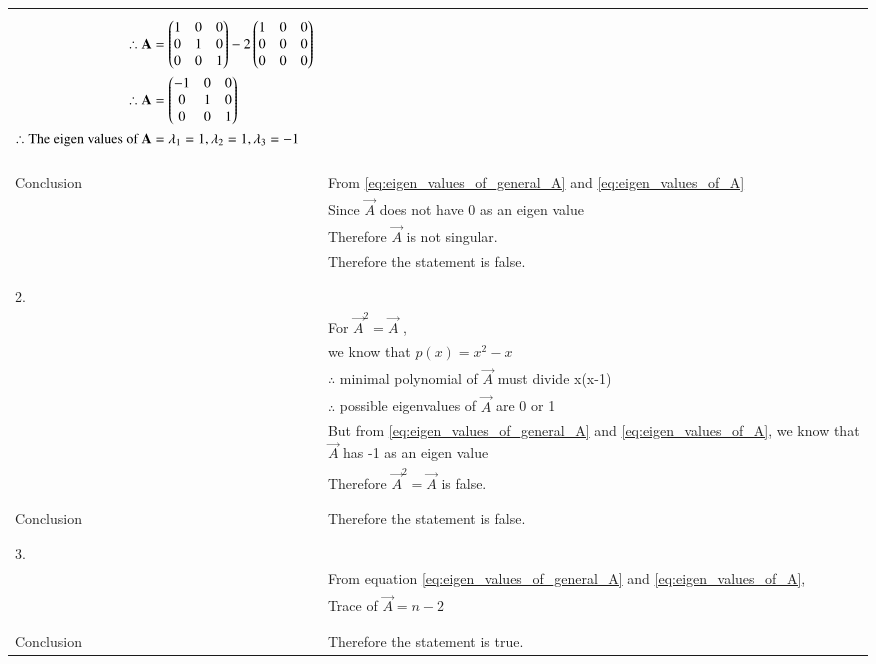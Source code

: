 \documentclass[journal,12pt]{IEEEtran}
\begin{document}
\begin{longtable}{|l|l|}
{\begin{align}
    \therefore \mathbf{A}&=\begin{pmatrix}1&0&0\\0&1&0\\0&0&1\end{pmatrix}-2\begin{pmatrix}1&0&0\\0&0&0\\0&0&0\end{pmatrix}\\
    \therefore \mathbf{A}&=\begin{pmatrix}-1&0&0\\0&1&0\\0&0&1\end{pmatrix}\label{eq:example_of_A}\\
    \therefore \mbox{The eigen values of }\mathbf{A}&=\lambda_1=1,\lambda_2=1,\lambda_3=-1\label{eq:eigen_values_of_A}
\end{align}}\\
&\\
\hline
&\\
Conclusion&From \eqref{eq:eigen_values_of_general_A} and \eqref{eq:eigen_values_of_A}\\
&Since $\vec{A}$ does not have 0 as an eigen value\\
&Therefore $\vec{A}$ is not singular.\\
&Therefore the statement is false.\\
&\\
\hline
&\\
2.&\\
& For $\vec{A}^2=\vec{A}$ ,\\
&we know that $p(x)=x^2-x$\\
&$\therefore$ minimal polynomial of $\vec{A}$ must divide x(x-1)\\
&$\therefore$ possible eigenvalues of $\vec{A}$ are 0 or 1\\
&But from \eqref{eq:eigen_values_of_general_A} and \eqref{eq:eigen_values_of_A}, we know that $\vec{A}$ has -1 as an eigen value\\
&Therefore $\vec{A}^2=\vec{A}$ is false.\\
&\\
\hline
&\\
Conclusion&Therefore the statement is false.\\
&\\
\hline
\pagebreak
\hline
&\\
3.&\\
& From equation \eqref{eq:eigen_values_of_general_A} and \eqref{eq:eigen_values_of_A},\\
&Trace of $\vec{A}=n-2$\\
&\\
\hline
&\\
Conclusion&Therefore the statement is true.\\

\end{longtable}
\end{document}
